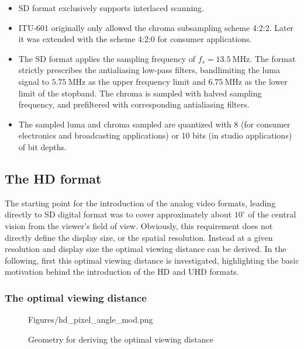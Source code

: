 \begin{itemize}
\item SD format exclusively supports interlaced scanning.
\item ITU-601 originally only allowed the chroma subsampling scheme 4:2:2.
Later it was extended with the scheme 4:2:0 for consumer applications.
\item The SD format applies the sampling frequency of $f_s = 13.5~\mathrm{MHz}$. 
The format strictly prescribes the antialiasing low-pass filters, bandlimiting the luma signal to $5.75~\mathrm{MHz}$ as the upper frequency limit and $6.75~\mathrm{MHz}$ as the lower limit of the stopband.
The chroma is sampled with halved sampling frequency, and prefiltered with corresponding antialiasing filters.
\item The sampled luma and chroma sampled are quantized with 8 (for consumer electronics and broadcasting applications) or 10 bits (in studio applications) of bit depths.
\end{itemize}

\subsection{The HD format}

The starting point for the introduction of the analog video formats, leading directly to SD digital format was to cover approximately about $10^{\circ}$ of the central vision from the viewer's field of view.
Obviously, this requirement does not directly define the display size, or the spatial resolution.
Instead at a given resolution and display size the optimal viewing distance can be derived.
In the following, first this optimal viewing distance is investigated, highlighting the basic motivation behind the introduction of the HD and UHD formats.

\subsubsection*{The optimal viewing distance}

\begin{figure}[]
	\centering
	\begin{overpic}[width = 0.67 \columnwidth ]{Figures/hd_pixel_angle_mod.png}
	\small
	\end{overpic}
	\caption{Geometry for deriving the optimal viewing distance}
	\label{Fig:optimal_vd}
\end{figure}

